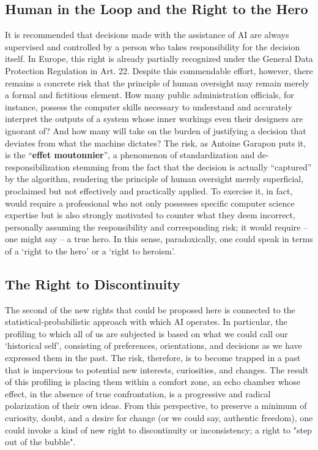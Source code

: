 \subsection{Human in the Loop and the Right to the Hero}
It is recommended that decisions made with the assistance of AI are always supervised and controlled by a person who takes responsibility for the decision itself. In Europe, this right is already partially recognized under the General Data Protection Regulation in Art. 22. Despite this commendable effort, however, there remains a concrete risk that the principle of human oversight may remain merely a formal and fictitious element. How many public administration officials, for instance, possess the computer skills necessary to understand and accurately interpret the outputs of a system whose inner workings even their designers are ignorant of? And how many will take on the burden of justifying a decision that deviates from what the machine dictates? The risk, as Antoine Garapon puts it, is the “\textbf{effet moutonnier}”, a phenomenon of standardization and de-responsibilization stemming from the fact that the decision is actually “captured” by the algorithm, rendering the principle of human oversight merely superficial, proclaimed but not effectively and practically applied. To exercise it, in fact, would require a professional who not only possesses specific computer science expertise but is also strongly motivated to counter what they deem incorrect, personally assuming the responsibility and corresponding risk; it would require – one might say – a true hero. In this sense, paradoxically, one could speak in terms of a ‘right to the hero’ or a ‘right to heroism’.

\subsection{The Right to Discontinuity}
The second of the new rights that could be proposed here is connected to the statistical-probabilistic approach with which AI operates. In particular, the profiling to which all of us are subjected is based on what we could call our ‘historical self’, consisting of preferences, orientations, and decisions as we have expressed them in the past. The risk, therefore, is to become trapped in a past that is impervious to potential new interests, curiosities, and changes. The result of this profiling is placing them within a comfort zone, an echo chamber whose effect, in the absence of true confrontation, is a progressive and radical polarization of their own ideas. From this perspective, to preserve a minimum of curiosity, doubt, and a desire for change (or we could say, authentic freedom), one could invoke a kind of new right to discontinuity or inconsistency; a right to "step out of the bubble".

